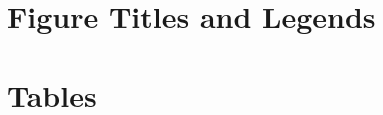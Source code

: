 \documentclass[12pt]{article}
\begin{document}




\newpage
\section*{Figure Titles and Legends}









\section*{Tables}






\end{document}
